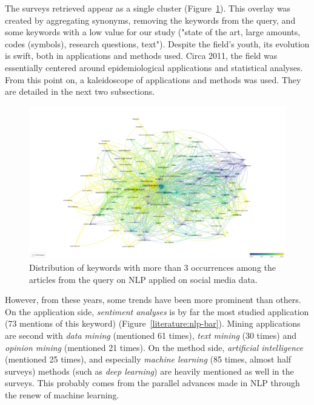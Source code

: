 The surveys retrieved appear as a single cluster (Figure~\ref{literature:nlp-overlay}).
This overlay was created by aggregating synonyms, removing the keywords from the query, and some keywords with a low value for our study ("state of the art, large amounts, codes (symbols), research questions, text").
Despite the field's youth, its evolution is swift, both in applications and methods used.
Circa 2011, the field was essentially centered around epidemiological applications and statistical analyses.
From this point on, a kaleidoscope of applications and methods was used.
They are detailed in the next two subsections.

\begin{landscape}
    \begin{figure}[htb]
        \includegraphics[width=\paperwidth,height=\paperheight,keepaspectratio]{figures/chap-2/nlp-overlay.pdf}
        \caption{Distribution of keywords with more than 3 occurrences among the articles from the query on NLP applied on social media data.}
        \label{literature:nlp-overlay}
    \end{figure}
\end{landscape}

However, from these years, some trends have been more prominent than others.
On the application side, \emph{sentiment analyses} is by far the most studied application (73 mentions of this keyword) (Figure~\ref{literature:nlp-bar}).
Mining applications are second with \emph{data mining} (mentioned 61 times), \emph{text mining} (30 times) and \emph{opinion mining} (mentioned 21 times).
On the method side, \emph{artificial intelligence} (mentioned 25 times), and especially \emph{machine learning} (85 times, almost half surveys) methods (such as \emph{deep learning}) are heavily mentioned as well in the surveys.
This probably comes from the parallel advances made in NLP through the renew of machine learning.

